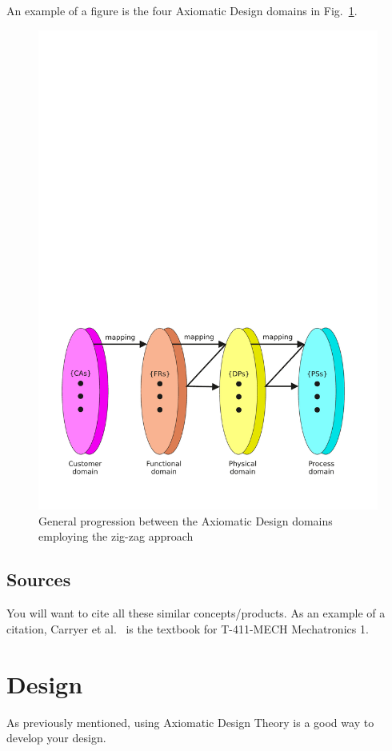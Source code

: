 \documentclass[sn-mathphys]{sn-jnl}%
\theoremstyle{thmstyleone}%
\theoremstyle{thmstyletwo}%
\theoremstyle{thmstylethree}%
\begin{document}
An example of a figure is the four Axiomatic Design domains in Fig.~\ref{fig:ad-domains}.
\begin{figure}
  \centering
  \includegraphics[width=0.9\columnwidth]{ad-domains-zig}
  \caption{General progression between the Axiomatic Design domains employing the zig-zag approach}\label{fig:ad-domains}
\end{figure}



\subsection{Sources}\label{sec:sources}
You will want to cite all these similar concepts/products.
As an example of a citation, Carryer et al.~\cite{carryer2011IntroMechatronics} is the textbook for T-411-MECH Mechatronics 1.


\section{Design}\label{sec:design}
As previously mentioned, using Axiomatic Design Theory is a good way to develop your design.
\end{document}
